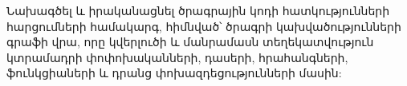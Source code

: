 {
	Նախագծել և իրականացնել ծրագրային կոդի հատկությունների հարցումների համակարգ,
	հիմնված՝ ծրագրի կախվածությունների գրաֆի վրա, որը կվերլուծի և մանրամասն տեղեկատվություն կտրամադրի
	փոփոխականների, դասերի, հրահանգների, ֆունկցիաների և դրանց փոխազդեցությունների մասին:
}